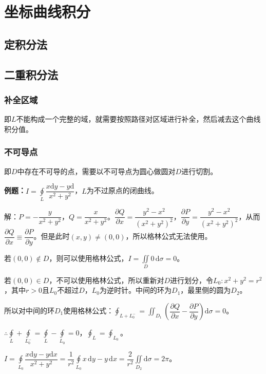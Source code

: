 \documentclass[UTF8, 12pt]{ctexart}
\begin{document}
\section{坐标曲线积分}

\subsection{定积分法}

\subsection{二重积分法}

\subsubsection{补全区域}

即$L$不能构成一个完整的域，就需要按照路径对区域进行补全，然后减去这个曲线积分值。

\subsubsection{不可导点}

即$D$中存在不可导的点，需要以不可导点为圆心做圆对$D$进行切割。

\textbf{例题：}$I=\displaystyle{\oint\limits_L\dfrac{x\textrm{d}y-y\textrm{d}}{x^2+y^2}}$，$L$为不过原点的闭曲线。

解：$P=-\dfrac{y}{x^2+y^2}$，$Q=\dfrac{x}{x^2+y^2}$。$\dfrac{\partial Q}{\partial x}=\dfrac{y^2-x^2}{(x^2+y^2)^2}$，$\dfrac{\partial P}{\partial y}=\dfrac{y^2-x^2}{(x^2+y^2)^2}$，从而$\dfrac{\partial Q}{\partial x}\equiv\dfrac{\partial P}{\partial y}$。但是此时$(x,y)\neq(0,0)$，所以格林公式无法使用。

若$(0,0)\notin D$，则可以使用格林公式，$I=\iint\limits_D0\,\textrm{d}\sigma=0$。

若$(0,0)\in D$，不可以使用格林公式，所以重新对$D$进行划分，令$L_0:x^2+y^2=r^2$，其中$r>0$且$L_0$不超过$D$，$L_0$为逆时针。中间的环为$D_1$，最里侧的圆为$D_2$。

所以对中间的环$D_1$使用格林公式：$\oint_{L+L_0^-}=\iint_{D_1}\left(\dfrac{\partial Q}{\partial x}-\dfrac{\partial P}{\partial y}\right)\textrm{d}\sigma=0$。

$\therefore\oint\limits_L+\oint\limits_{L_0^-}=\oint\limits_L-\oint\limits_{L_0}=0$，$\oint_L=\oint_{L_0}$。

$I=\displaystyle{\oint\limits_{L_0}\dfrac{x\textrm{d}y-y\textrm{d}x}{x^2+y^2}=\dfrac{1}{r^2}\oint\limits_{L_0}x\,\textrm{d}y-y\,\textrm{d}x=\dfrac{2}{r^2}\iint\limits_{D_2}\textrm{d}\sigma=2\pi}$。
\end{document}
